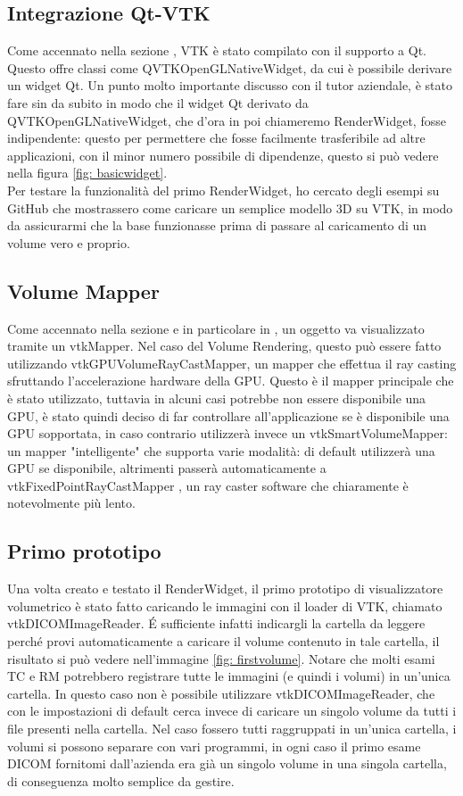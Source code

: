 \subsection{Integrazione Qt-VTK}
Come accennato nella sezione , VTK è stato compilato con il supporto a Qt. Questo offre classi come QVTKOpenGLNativeWidget, da cui è possibile derivare un widget Qt. Un punto molto importante discusso con il tutor aziendale, è stato fare sin da subito in modo che il widget Qt derivato da QVTKOpenGLNativeWidget, che d'ora in poi chiameremo RenderWidget, fosse indipendente: questo per permettere che fosse facilmente trasferibile ad altre applicazioni, con il minor numero possibile di dipendenze, questo si può vedere nella figura \ref{fig: basicwidget}.
\\
Per testare la funzionalità del primo RenderWidget, ho cercato degli esempi su GitHub che mostrassero come caricare un semplice modello 3D su VTK, in modo da assicurarmi che la base funzionasse prima di passare al caricamento di un volume vero e proprio.

\subsection{Volume Mapper}
Come accennato nella sezione  e in particolare in , un oggetto va visualizzato tramite un vtkMapper. Nel caso del Volume Rendering, questo può essere fatto utilizzando vtkGPUVolumeRayCastMapper, un mapper che effettua il ray casting sfruttando l'accelerazione hardware della GPU. Questo è il mapper principale che è stato utilizzato, tuttavia in alcuni casi potrebbe non essere disponibile una GPU, è stato quindi deciso di far controllare all'applicazione se è disponibile una GPU sopportata, in caso contrario utilizzerà invece un vtkSmartVolumeMapper: un mapper "intelligente" che supporta varie modalità: di default utilizzerà una GPU se disponibile, altrimenti passerà automaticamente a vtkFixedPointRayCastMapper , un ray caster software che chiaramente è notevolmente più lento.

\subsection{Primo prototipo}
Una volta creato e testato il RenderWidget, il primo prototipo di visualizzatore volumetrico è stato fatto caricando le immagini con il loader di VTK, chiamato vtkDICOMImageReader. \'E sufficiente infatti indicargli la cartella da leggere perché provi automaticamente a caricare il volume contenuto in tale cartella, il risultato si può vedere nell'immagine \ref{fig: firstvolume}. Notare che molti esami TC e RM potrebbero registrare tutte le immagini (e quindi i volumi) in un'unica cartella. In questo caso non è possibile utilizzare vtkDICOMImageReader, che con le impostazioni di default cerca invece di caricare un singolo volume da tutti i file presenti nella cartella. Nel caso fossero tutti raggruppati in un'unica cartella, i volumi si possono separare con vari programmi, in ogni caso il primo esame DICOM fornitomi dall'azienda era già un singolo volume in una singola cartella, di conseguenza molto semplice da gestire.

